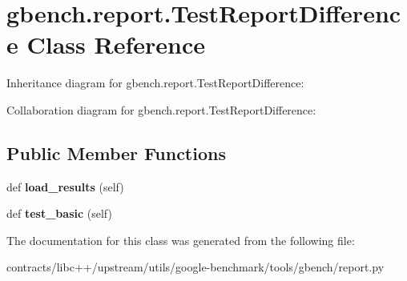 \hypertarget{classgbench_1_1report_1_1_test_report_difference}{}\section{gbench.\+report.\+Test\+Report\+Difference Class Reference}
\label{classgbench_1_1report_1_1_test_report_difference}


Inheritance diagram for gbench.\+report.\+Test\+Report\+Difference\+:


Collaboration diagram for gbench.\+report.\+Test\+Report\+Difference\+:
\subsection*{Public Member Functions}
\begin{DoxyCompactItemize}
\item 
\mbox{\label{classgbench_1_1report_1_1_test_report_difference_a490ca18e6efb08c56cecdb119a9d945c}} 
def {\bfseries load\+\_\+results} (self)
\item 
\mbox{\label{classgbench_1_1report_1_1_test_report_difference_a99f45b3e6aed1838776770641d05c026}} 
def {\bfseries test\+\_\+basic} (self)
\end{DoxyCompactItemize}


The documentation for this class was generated from the following file\+:\begin{DoxyCompactItemize}
\item 
contracts/libc++/upstream/utils/google-\/benchmark/tools/gbench/report.\+py\end{DoxyCompactItemize}
